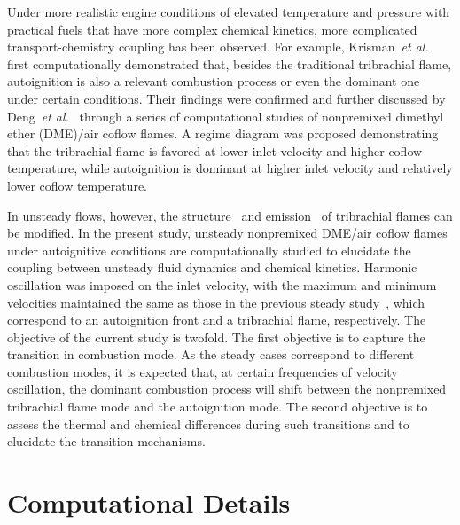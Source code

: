 \documentclass{essci}
\begin{document}
Under more realistic engine conditions of elevated temperature and pressure with practical fuels that have more complex chemical kinetics, more complicated transport-chemistry coupling has been observed.  For example, Krisman~\emph{et al.}~\cite{krisman14} first computationally demonstrated that, besides the traditional tribrachial flame, autoignition is also a relevant combustion process or even the dominant one under certain conditions.  Their findings were confirmed and further discussed by Deng~\emph{et al.}~\cite{deng15,deng15b} through a series of computational studies of nonpremixed dimethyl ether (DME)/air coflow flames.  A regime diagram was proposed demonstrating that the tribrachial flame is favored at lower inlet velocity and higher coflow temperature, while autoignition is dominant at higher inlet velocity and relatively lower coflow temperature.

In unsteady flows, however, the structure~\cite{strawa89,sanchezsanz10} and emission~\cite{shaddix94,skaggs96,mohammed98,dworkin07} of tribrachial flames can be modified.  In the present study, unsteady nonpremixed DME/air coflow flames under autoignitive conditions are computationally studied to elucidate the coupling between unsteady fluid dynamics and chemical kinetics.  Harmonic oscillation was imposed on the inlet velocity, with the maximum and minimum velocities maintained the same as those in the previous steady study~\cite{deng15b}, which correspond to an autoignition front and a tribrachial flame, respectively.  The objective of the current study is twofold.  The first objective is to capture the transition in combustion mode.  As the steady cases correspond to different combustion modes, it is expected that, at certain frequencies of velocity oscillation, the dominant combustion process will shift between the nonpremixed tribrachial flame mode and the autoignition mode.  The second objective is to assess the thermal and chemical differences during such transitions and to elucidate the transition mechanisms.


\section{Computational Details}
\end{document}
